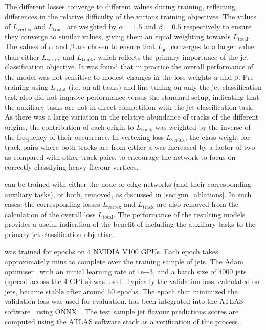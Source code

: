 The different losses converge to different values during training, reflecting differences in the relative difficulty of the various training objectives.
The values of $L_\text{vertex}$ and $L_\text{track}$ are weighted by $\alpha = 1.5$ and $\beta = 0.5$ respectively to ensure they converge to similar values, giving them an equal weighting towards $L_\text{total}$. 
The values of $\alpha$ and $\beta$ are chosen to ensure that $L_\text{jet}$ converges to a larger value than either $L_\text{vertex}$ and $L_\text{track}$, which reflects the primary importance of the jet classification objective.
It was found that in practice the overall performance of the model was not sensitive to modest changes in the loss weights $\alpha$ and $\beta$.
Pre-training using $L_\text{total}$ (i.e. on all tasks) and fine tuning on only the jet classification task also did not improve performance versus the standard setup, indicating that the auxiliary tasks are not in direct competition with the jet classification task.
As there was a large variation in the relative abundance of tracks of the different origins, the contribution of each origin to $L_\text{track}$ was weighted by the inverse of the frequency of their occurrence.
In vertexing loss $L_\text{vertex}$, the class weight for track-pairs where both tracks are from either a \borchadron was increased by a factor of two as compared with other track-pairs, to encourage the network to focus on correctly classifying heavy flavour vertices.

\GNN can be trained with either the node or edge networks (and their corresponding auxiliary tasks), or both, removed, as discussed in \cref{sec:gnn_ablations}.
In such cases, the corresponding losses $L_\text{vertex}$ and $L_\text{track}$ are also removed from the calculation of the overall loss $L_\text{total}$. 
The performance of the resulting models provides a useful indication of the benefit of including the auxiliary tasks to the primary jet classification objective.

\GNN was trained for \nepochs epochs on 4 NVIDIA V100 GPUs.
Each epoch takes approximately \minsperepoch mins to complete over the training sample of \njetstrain jets.
The Adam optimiser~\cite{arxiv.1412.6980} with an initial learning rate of $1\mathrm{e}{-3}$, and a batch size of 4000 jets (spread across the 4 GPUs) was used.
Typically the validation loss, calculated on \njetsval jets, became stable after around 60 epochs.
The epoch that minimized the validation loss was used for evaluation.
\GNN has been integrated into the ATLAS software~\cite{ATL-SOFT-PUB-2021-001} using ONNX~\cite{bai2019}.
The test sample jet flavour predictions scores are computed using the ATLAS software stack as a verification of this process.


